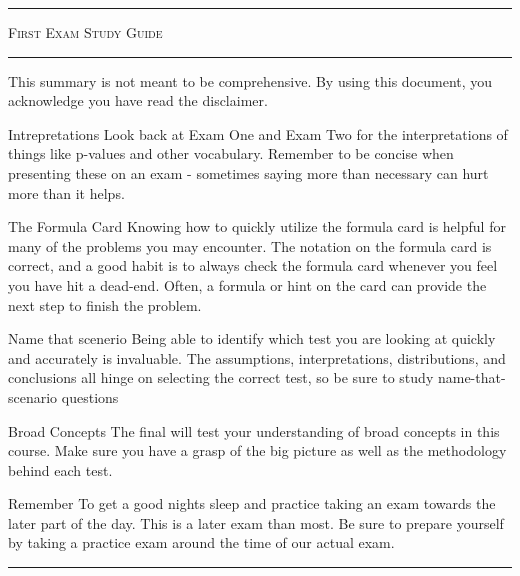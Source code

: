 \documentclass[landscape]{article}
\title{}
\author{}
\newcommand{\myline}{\vspace{4pt}\hrule  \vspace{4pt}}
\newenvironment{topic}[1]{
	\noindent \textbf{\textsc{\color{harvardcrimson}{#1}}}
	\noindent \hspace{-3.5pt}
}{
	\myline
}
\newenvironment{compactdesc}{
	\begin{description}[leftmargin=1em,labelsep=0.7em, font=\normalfont\itshape]
	}{
	\end{description}
}
\begin{document}
	\footnotesize

	\begin{multicols*}{3}
	\hfill
	\vspace{-1\baselineskip}
	\hfill
	
	\myline
	\vspace{-0.2cm}
	\begin{center}
		\LARGE \textsc{First Exam Study Guide} 
	\end{center}
	\vspace{-0.2cm}
	\myline 
	
		
	\begin{topic}{Introduction}
		This summary is not meant to be comprehensive. By using this document, you acknowledge you have read the disclaimer.
		\begin{compactdesc}
			\item[Intrepretations] Look back at Exam One and Exam Two for the interpretations of things like p-values and other vocabulary. Remember to be concise when presenting these on an exam - sometimes saying more than necessary can hurt more than it helps.
			\item[The Formula Card] Knowing how to quickly utilize the formula card is helpful for many of the problems you may encounter. The notation on the formula card is correct, and a good habit is to always check the formula card whenever you feel you have hit a dead-end. Often, a formula or hint on the card can provide the next step to finish the problem. 
			\item[Name that scenerio] Being able to identify which test you are looking at quickly and accurately is invaluable. The assumptions, interpretations, distributions, and conclusions all hinge on selecting the correct test, so be sure to study name-that-scenario questions
			\item[Broad Concepts] The final will test your understanding of broad concepts in this course. Make sure you have a grasp of the big picture as well as the methodology behind each test. 
			\item[Remember] To get a good nights sleep and practice taking an exam towards the later part of the day. This is a later exam than most. Be sure to prepare yourself by taking a practice exam around the time of our actual exam. 
		\end{compactdesc}
	\end{topic}
	

\end{multicols*}
\end{document}
